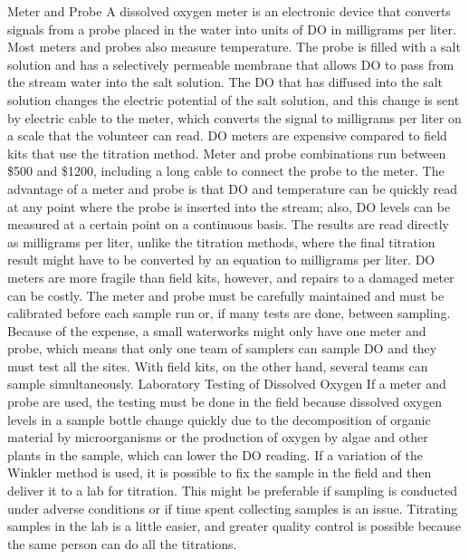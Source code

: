 \documentclass{article}
\begin{document}
Meter and Probe A dissolved oxygen meter is an electronic device that
converts signals from a probe placed in the water into units of DO in
milligrams per liter. Most meters and probes also measure temperature.
The probe is filled with a salt solution and has a selectively permeable
membrane that allows DO to pass from the stream water into the salt
solution. The DO that has diffused into the salt solution changes the
electric potential of the salt solution, and this change is sent by
electric cable to the meter, which converts the signal to milligrams per
liter on a scale that the volunteer can read. DO meters are expensive
compared to field kits that use the titration method. Meter and probe
combinations run between \$500 and \$1200, including a long cable to
connect the probe to the meter. The advantage of a meter and probe is
that DO and temperature can be quickly read at any point where the probe
is inserted into the stream; also, DO levels can be measured at a
certain point on a continuous basis. The results are read directly as
milligrams per liter, unlike the titration methods, where the final
titration result might have to be converted by an equation to milligrams
per liter. DO meters are more fragile than field kits, however, and
repairs to a damaged meter can be costly. The meter and probe must be
carefully maintained and must be calibrated before each sample run or,
if many tests are done, between sampling. Because of the expense, a
small waterworks might only have one meter and probe, which means that
only one team of samplers can sample DO and they must test all the
sites. With field kits, on the other hand, several teams can sample
simultaneously. Laboratory Testing of Dissolved Oxygen If a meter and
probe are used, the testing must be done in the field because dissolved
oxygen levels in a sample bottle change quickly due to the decomposition
of organic material by microorganisms or the production of oxygen by
algae and other plants in the sample, which can lower the DO reading. If
a variation of the Winkler method is used, it is possible to fix the
sample in the field and then deliver it to a lab for titration. This
might be preferable if sampling is conducted under adverse conditions or
if time spent collecting samples is an issue. Titrating samples in the
lab is a little easier, and greater quality control is possible because
the same person can do all the titrations.
\end{document}

